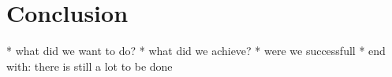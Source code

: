 \section{Conclusion}


* what did we want to do?
* what did we achieve?
* were we successfull
* end with: there is still a lot to be done
